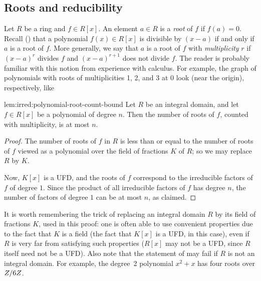 \subsection{Roots and reducibility}
\label{subsec:irred:roots-and-reducibility}
Let $R$ be a ring and $f \in R[x]$. An element $a \in R$ is a
\emph{root} of $f$ if $f(a) = 0$. Recall
() that a polynomial
$f(x) \in R[x]$ is divisible by $(x - a)$ if and only if $a$ is a root
of $f$. More generally, we say that $a$ is a root of $f$ with
\emph{multiplicity} $r$ if $(x - a)^r$ divides $f$ and $(x - a)^{r+1}$
does not divide $f$. The reader is probably familiar with this notion
from experience with calculus. For example, the graph of polynomials
with roots of multiplicities 1, 2, and 3 at 0 look (near the origin),
respectively, like
\begin{lem}{}{lem:irred:polynomial-root-count-bound}
  Let $R$ be an integral domain, and let $f \in R[x]$ be a polynomial
  of degree $n$. Then the number of roots of $f$, counted with
  multiplicity, is at most $n$.
\end{lem}
\begin{proof}
  The number of roots of $f$ in $R$ is less than or equal to the
  number of roots of $f$ viewed as a polynomial over the field of
  fractions $K$ of $R$; so we may replace $R$ by $K$.

  Now, $K[x]$ is a UFD, and the roots of $f$ correspond to the
  irreducible factors of $f$ of degree $1$. Since the product of all
  irreducible factors of $f$ has degree $n$, the number of factors of
  degree $1$ can be at most $n$, as claimed.
\end{proof}
It is worth remembering the trick of replacing an integral domain $R$
by its field of fractions $K$, used in this proof: one is often able
to use convenient properties due to the fact that $K$ is a field (the
fact that $K[x]$ is a UFD, in this case), even if $R$ is very far from
satisfying such properties ($R[x]$ may not be a UFD, since $R$ itself
need not be a UFD). Also note that the statement of
 may fail if $R$ is not an integral domain. For
example, the degree~2 polynomial $x^2 + x$ has four roots over
$Z/6Z$.

